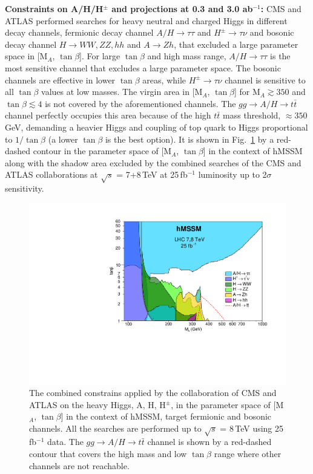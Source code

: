 \noindent \textbf{Constraints on A/H/H$^{\pm}$ and projections at 0.3 and 3.0 ab$^{-1}$:}
CMS and ATLAS performed searches for heavy neutral and charged Higgs in different decay channels, fermionic decay channel $A/H\rightarrow \tau\tau$ and $H^{\pm}\rightarrow \tau\nu$ and bosonic decay channel $H\rightarrow WW, ZZ, hh$ and $A\rightarrow Zh$, that excluded a large parameter space in [M$_{A}$, $\tan\beta$]. For large $\tan\beta$ and high mass range, $A/H\rightarrow \tau \tau$ is the most sensitive channel that excludes a large parameter space. The bosonic channels are effective in lower $\tan\beta$ areas, while $H^{\pm}\rightarrow \tau\nu$ channel is sensitive to all $\tan\beta$ values at low masses. The virgin area in [M$_{A}$, $\tan\beta$] for M$_{A}\gtrsim 350$ and $\tan\beta \lesssim 4$ is not covered by the aforementioned channels. The $gg\rightarrow A/H\rightarrow t\bar t$ channel perfectly occupies this area because of the high $t\bar t$ mass threshold, $\approx 350$\,GeV, demanding a heavier Higgs and coupling of top quark to Higgs proportional to $1/\tan\beta$ (a lower $\tan\beta$ is the best option). It is shown in Fig.~\ref{fig:heavy_higgs8tev_exclusion} by a red-dashed contour in the parameter space of [M$_{A}$, $\tan\beta$] in the context of hMSSM along with the shadow area excluded by the combined searches of the CMS and ATLAS collaborations at $\sqrt{s}$ = 7+8\,TeV at 25\,fb$^{-1}$ luminosity up to 2$\sigma$ sensitivity. 
\begin{figure}[htp]
\centering
\includegraphics[trim={0cm 0.0cm 0 0},clip, scale=0.5]{fig/sm_beyond/httplots_constraints_LHC8_all.pdf}
\caption{
The combined constrains applied by the collaboration of CMS and ATLAS on the heavy Higgs, A, H, H$^{\pm}$, in the parameter space of [M$_{A}$, $\tan\beta$] in the context of hMSSM, target fermionic and bosonic channels. All the searches are performed up to $\sqrt{s}$ = 8\,TeV using 25\,fb$^{-1}$ data. The $gg\rightarrow A/H\rightarrow t\bar t$ channel is shown by a red-dashed contour that covers the high mass and low $\tan\beta$ range where other channels are not reachable\cite{Djouadi:2015jea}. 
}\label{fig:heavy_higgs8tev_exclusion}
\end{figure}

